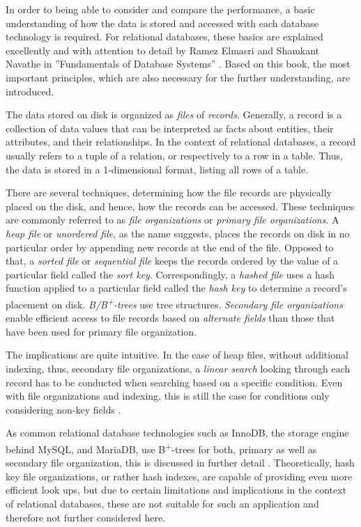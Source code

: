 In order to being able to consider and compare the performance, a basic understanding of how the data is stored and accessed with each database technology is required. For relational databases, these basics are explained excellently and with attention to detail by Ramez Elmasri and Shamkant Navathe in ''Fundamentals of Database Systems'' \cite{DatabaseFundamentals}. Based on this book, the most important principles, which are also necessary for the further understanding, are introduced.\par
The data stored on disk is organized as \emph{files} of \emph{records}. Generally, a record is a collection of data values that can be interpreted as facts about entities, their attributes, and their relationships. In the context of relational databases, a record usually refers to a tuple of a relation, or respectively to a row in a table. Thus, the data is stored in a 1-dimensional format, listing all rows of a table.\par
There are several techniques, determining how the file records are physically placed on the disk, and hence, how the records can be accessed. These techniques are commonly referred to as \emph{file organizations} or \emph{primary file organizations}. A \emph{heap file} or \emph{unordered file}, as the name suggests, places the records on disk in no particular order by appending new records at the end of the file. Opposed to that, a \emph{sorted file} or \emph{sequential file} keeps the records ordered by the value of a particular field called the \emph{sort key}. Correspondingly, a \emph{hashed file} uses a hash function applied to a particular field called the \emph{hash key} to determine a record's placement on disk. \emph{B/B\textsuperscript{+}-trees} use tree structures. \emph{Secondary file organizations} enable efficient access to file records based on \emph{alternate fields} than those that have been used for primary file organization.\par
The implications are quite intuitive. In the case of heap files, without additional indexing, thus, secondary file organizations, a \emph{linear search} looking through each record has to be conducted when searching based on a specific condition. Even with file organizations and indexing, this is still the case for conditions only considering non-key fields \cite{DatabaseFundamentals}.\par
As common relational database technologies such as InnoDB, the storage engine behind MySQL, and MariaDB, use B\textsuperscript{+}-trees for both, primary as well as secondary file organization, this is discussed in further detail \cite{InnoDB}. Theoretically, hash key file organizations, or rather hash indexes, are capable of providing even more efficient look ups, but due to certain limitations and implications in the context of relational databases, these are not suitable for such an application and therefore not further considered here.

